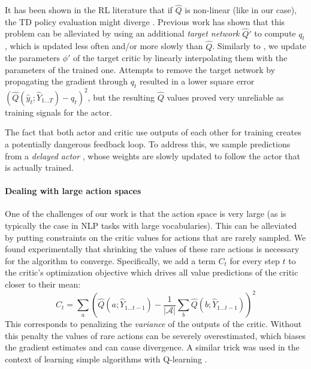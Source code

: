 \documentclass{article} %
\begin{document}
It has been shown in the RL literature that if $\hat{Q}$ is non-linear (like 
in our case), the TD policy evaluation might diverge \citep{tsitsiklis1997analysis}.
Previous work has shown that this problem can be alleviated by using an additional
\emph{target network}
$\hat{Q}'$ to compute $q_t$, which is updated less often and/or more slowly than $\hat{Q}$. 
Similarly to \citep{lillicrap2015continuous}, we update the parameters $\phi'$
of the target critic by linearly interpolating them with the parameters of the trained
one.
Attempts to remove the target network by propagating the gradient through $q_t$ 
resulted in a lower square error 
$(\hat{Q}(\hat{y}_t;  \hat{Y}_{1 \ldots T}) - q_t)^2$, but the resulting $\hat{Q}$ 
values proved very unreliable as training signals for the actor.

The fact that both actor and critic use
outputs of each other for training creates a potentially
dangerous feedback loop. To address this, we
sample predictions from a \textit{delayed actor} \citep{lillicrap2015continuous},
whose weights are slowly updated to follow the actor that
is actually trained.

\paragraph{Dealing with large action spaces}

One of the challenges of our work is that the action space is very large (as is typically the case in
NLP tasks with large vocabularies). This can be alleviated by putting constraints on
the critic values for actions that are rarely sampled. We found experimentally
that shrinking the values of these rare actions is
 necessary for the algorithm to converge. Specifically, we add a term $C_t$ for every step $t$ to the
critic's optimization objective which drives all value predictions of the critic
closer to their mean: 
\begin{equation} 
    C_t = \sum_{a}\left( 
        \hat{Q}(a; \hat{Y}_{1\ldots t-1}) 
        - \frac{1}{|\mathcal{A}|}\sum_{b}\hat{Q}(b; \hat{Y}_{1 \ldots t-1}) 
    \right)^2 \label{eq:variance_penalty}
\end{equation} This corresponds to
penalizing the \emph{variance} of the outputs of the critic. 
Without this penalty the values of rare actions can be severely overestimated,
which biases the gradient estimates and can cause divergence. 
A similar trick was used in the context of learning 
simple algorithms with Q-learning \citep{zaremba2015learning}.
\end{document}
